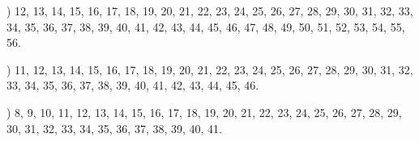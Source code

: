 \documentclass[a4paper,11pt]{article}
\begin{document}
\vspace{\spaceFour}



\noindent
{}) 12, 13, 14, 15, 16, 17, 18, 19, 20, 21, 22, 23, 24,
25, 26, 27, 28, 29, 30, 31, 32, 33, 34, 35, 36, 37, 38, 39, 40, 41,
42, 43, 44, 45, 46, 47, 48, 49, 50, 51, 52, 53, 54, 55, 56.

\vspace{\spaceFour}



\noindent
{}) 11, 12, 13, 14, 15, 16, 17, 18, 19, 20, 21, 22, 23,
24, 25, 26, 27, 28, 29, 30, 31, 32, 33, 34, 35, 36, 37, 38, 39, 40,
41, 42, 43, 44, 45, 46.

\vspace{\spaceFour}



\noindent
{}) 8, 9, 10, 11, 12, 13, 14, 15, 16, 17, 18, 19, 20, 21,
22, 23, 24, 25, 26, 27, 28, 29, 30, 31, 32, 33, 34, 35, 36, 37, 38,
39, 40, 41.





\end{document}
